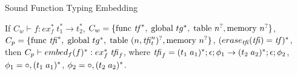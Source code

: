 \begin{lemma}{Sound Function Typing Embedding}

    If $C_w \vdash f : ex_f^{*}\; t_1^{*} \rightarrow t_2^{*}$,
    $C_w = \{ \text{func } \tf^{*},\; \text{global } tg^{*},\; \text{table } n^{?}, \text{memory } n^{?} \}$,
    $C_p = \{ \text{func } \tfi^{*},\; \text{global } tg^{*},\; \text{table } (n,\tfi_t^n)^{?}, \text{memory } n^{?} \}$,
    $(\erase[\tfi]{\tfi} = \tf)^{*}$,
    \\ then $C_p \vdash \embed[f]{f}^{*} : ex_f^{*}\; \tfi_f$, where
    $\tfi_f = \ti{t_1}{a_1}^{*};\epsilon;\phi_1 \rightarrow \ti{t_2}{a_2}^{*};\epsilon;\phi_2$,
    $\phi_1 = \circ,\ti{t_1}{a_1}^{*}$,
    $\phi_2 = \circ,\ti{t_2}{a_2}^{*}$.
\end{lemma}
